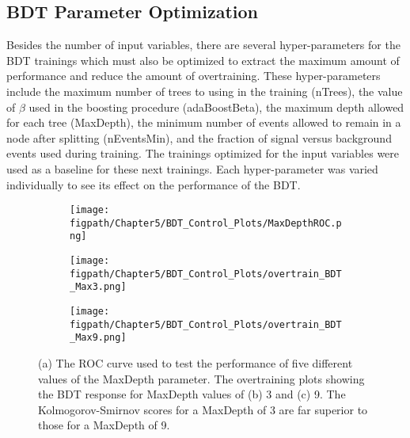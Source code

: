 \subsection{BDT Parameter Optimization}
\label{sec:BDT_parameter_optimization}

Besides the number of input variables, there are several hyper-parameters for the BDT trainings which must also be optimized to extract the maximum amount of performance and reduce the amount of overtraining.
These hyper-parameters include the maximum number of trees to using in the training (nTrees), the value of $\beta$ used in the boosting procedure (adaBoostBeta), the maximum depth allowed for each tree (MaxDepth), the minimum number of events allowed to remain in a node after splitting (nEventsMin), and the fraction of signal versus background events used during training.
The trainings optimized for the input variables were used as a baseline for these next trainings.
Each hyper-parameter was varied individually to see its effect on the performance of the BDT.

\begin{figure}[!hbt]
    \centering
    \begin{subfigure}[t]{0.48\textwidth}
        \texttt{[image: \\figpath/Chapter5/BDT\_Control\_Plots/MaxDepthROC.png]}
        \caption{}
        \label{fig:KinBDT_ROC_MaxDepth}
    \end{subfigure}

    \begin{subfigure}[t]{0.48\textwidth}
        \texttt{[image: \\figpath/Chapter5/BDT\_Control\_Plots/overtrain\_BDT\_Max3.png]}
        \caption{}
        \label{fig:KinBDT_Ovetrain_MaxDepth3}
    \end{subfigure}
    \begin{subfigure}[t]{0.48\textwidth}
        \texttt{[image: \\figpath/Chapter5/BDT\_Control\_Plots/overtrain\_BDT\_Max9.png]}
        \caption{}
        \label{fig:KinBDT_Ovetrain_MaxDepth9}
    \end{subfigure}
    \caption{(a) The ROC curve used to test the performance of five different values of the MaxDepth parameter. The overtraining plots showing the BDT response for MaxDepth values of (b) 3 and (c) 9. The Kolmogorov-Smirnov scores for a MaxDepth of 3 are far superior to those for a MaxDepth of 9.}
    \label{fig:KinBDT_MaxDepth_Example}
\end{figure}

